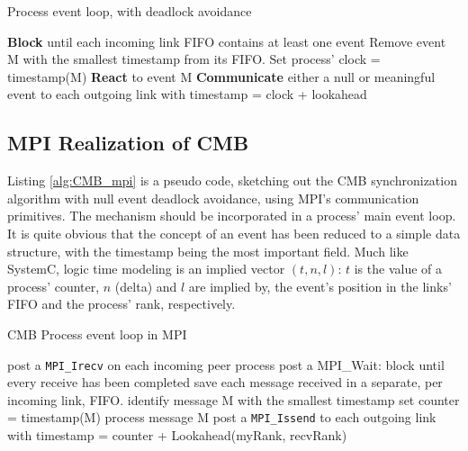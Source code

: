 \documentclass[11pt]{article}
\begin{document}
\begin{LATEX}
\begin{algorithm}
\caption{Process event loop, with deadlock avoidance}
\label{alg:null-event}
\begin{algorithmic}[1]

      \State \textbf{Block} until each incoming link FIFO contains at least one event
      \State Remove event M with the smallest timestamp from its FIFO.
      \State Set process' clock = timestamp(M)
      \State \textbf{React} to event M
      \State \textbf{Communicate} either a null or meaningful event to each outgoing link with timestamp = clock + lookahead
   \EndWhile

\end{algorithmic}
\end{algorithm}
\end{LATEX}

\subsection{MPI Realization of CMB}
\label{sec:orgabc787f}
Listing \ref{alg:CMB_mpi} is a pseudo code, sketching out the CMB synchronization algorithm with null event deadlock avoidance, using MPI's communication primitives.
The mechanism should be incorporated in a process' main event loop.
It is quite obvious that the concept of an event has been reduced to a simple data structure, with the timestamp being the most important field.
Much like SystemC, logic time modeling is an implied vector \((t,n,l)\): \(t\) is the value of a process' counter, \(n\) (delta) and \(l\) are implied by, the event's position in the links' FIFO and the process' rank, respectively.
\begin{LATEX}
\begin{algorithm}
\caption{CMB Process event loop in MPI}
\label{alg:CMB_mpi}
\begin{algorithmic}[2]

      \State post a \texttt{MPI\_Irecv} on each incoming peer process
      \State post a MPI\_Wait: block until every receive has been completed
      \State save each message received in a separate, per incoming link, FIFO.
      \State identify message M with the smallest timestamp
      \State set counter = timestamp(M)
      \State process message M
      \State post a \texttt{MPI\_Issend} to each outgoing link with timestamp = counter + Lookahead(myRank, recvRank)
   \EndWhile

\end{algorithmic}
\end{algorithm}
\end{LATEX}
\end{document}
